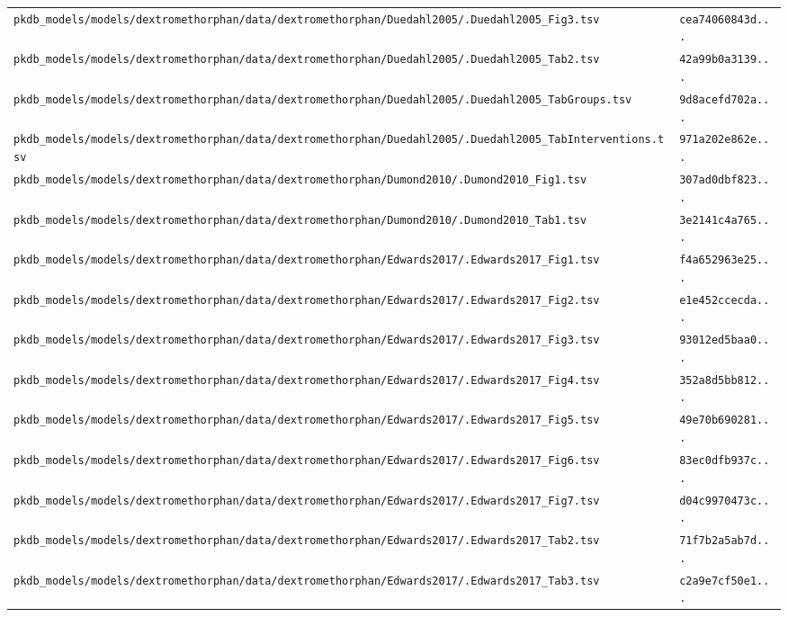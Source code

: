 \documentclass{article}
\begin{document}
\begin{longtable}{ll}
\texttt{pkdb\_models/models/dextromethorphan/data/dextromethorphan/Duedahl2005/.Duedahl2005\_Fig3.tsv} & \texttt{cea74060843d...} \\
\texttt{pkdb\_models/models/dextromethorphan/data/dextromethorphan/Duedahl2005/.Duedahl2005\_Tab2.tsv} & \texttt{42a99b0a3139...} \\
\texttt{pkdb\_models/models/dextromethorphan/data/dextromethorphan/Duedahl2005/.Duedahl2005\_TabGroups.tsv} & \texttt{9d8acefd702a...} \\
\texttt{pkdb\_models/models/dextromethorphan/data/dextromethorphan/Duedahl2005/.Duedahl2005\_TabInterventions.tsv} & \texttt{971a202e862e...} \\
\texttt{pkdb\_models/models/dextromethorphan/data/dextromethorphan/Dumond2010/.Dumond2010\_Fig1.tsv} & \texttt{307ad0dbf823...} \\
\texttt{pkdb\_models/models/dextromethorphan/data/dextromethorphan/Dumond2010/.Dumond2010\_Tab1.tsv} & \texttt{3e2141c4a765...} \\
\texttt{pkdb\_models/models/dextromethorphan/data/dextromethorphan/Edwards2017/.Edwards2017\_Fig1.tsv} & \texttt{f4a652963e25...} \\
\texttt{pkdb\_models/models/dextromethorphan/data/dextromethorphan/Edwards2017/.Edwards2017\_Fig2.tsv} & \texttt{e1e452ccecda...} \\
\texttt{pkdb\_models/models/dextromethorphan/data/dextromethorphan/Edwards2017/.Edwards2017\_Fig3.tsv} & \texttt{93012ed5baa0...} \\
\texttt{pkdb\_models/models/dextromethorphan/data/dextromethorphan/Edwards2017/.Edwards2017\_Fig4.tsv} & \texttt{352a8d5bb812...} \\
\texttt{pkdb\_models/models/dextromethorphan/data/dextromethorphan/Edwards2017/.Edwards2017\_Fig5.tsv} & \texttt{49e70b690281...} \\
\texttt{pkdb\_models/models/dextromethorphan/data/dextromethorphan/Edwards2017/.Edwards2017\_Fig6.tsv} & \texttt{83ec0dfb937c...} \\
\texttt{pkdb\_models/models/dextromethorphan/data/dextromethorphan/Edwards2017/.Edwards2017\_Fig7.tsv} & \texttt{d04c9970473c...} \\
\texttt{pkdb\_models/models/dextromethorphan/data/dextromethorphan/Edwards2017/.Edwards2017\_Tab2.tsv} & \texttt{71f7b2a5ab7d...} \\
\texttt{pkdb\_models/models/dextromethorphan/data/dextromethorphan/Edwards2017/.Edwards2017\_Tab3.tsv} & \texttt{c2a9e7cf50e1...} \\

\end{longtable}
\end{document}

